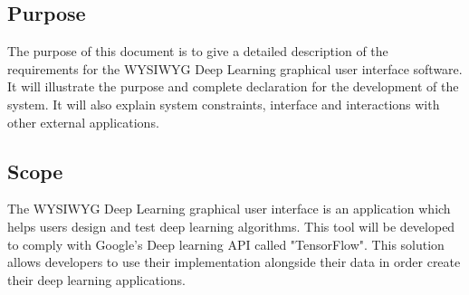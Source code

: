 \documentclass[journal,10pt,onecolumn,compsoc]{IEEEtran} \usepackage[margin=1.0in]{geometry} \usepackage{pdfpages} \usepackage{graphicx}
\begin{document}
\subsection{Purpose}

The purpose of this document is to give a detailed description of the requirements for the WYSIWYG Deep Learning graphical user interface software. It will illustrate the purpose and complete declaration for the development of the system. 
It will also explain system constraints, interface and interactions with other external applications. 

\subsection{Scope}

The WYSIWYG Deep Learning graphical user interface is an application which helps users design and test deep learning algorithms.
This tool will be developed to comply with Google's Deep learning API called "TensorFlow\texttrademark".
This solution allows developers to use their implementation alongside their data in order create their deep learning applications.
\end{document}
